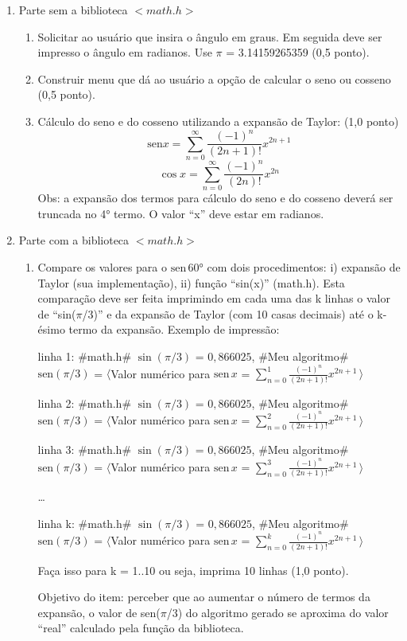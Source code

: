 \documentclass[12pt,a4paper]{article}
\newcommand{\sen}{\mathrm{sen}}
\begin{document}
\begin{enumerate}[label=\alph*)]
\item Parte sem a biblioteca $<math.h>$

\begin{enumerate}[label=a.\arabic*)]

\item Solicitar ao usuário que insira o ângulo em graus. Em seguida deve ser impresso o ângulo em radianos. Use $\pi$ = 3.14159265359 (0,5 ponto).
\item Construir menu que dá ao usuário a opção de calcular o seno ou cosseno (0,5 ponto).
\item Cálculo do seno e do cosseno utilizando a expansão de Taylor: (1,0 ponto) $$\sen x = \displaystyle\sum\limits_{n=0}^{\infty} \dfrac{(-1)^n}{(2n+1)!}x^{2n+1}$$ $$\cos x = \displaystyle\sum\limits_{n=0}^{\infty} \dfrac{(-1)^n}{(2n)!}x^{2n}$$ Obs: a expansão dos termos para cálculo do seno e do cosseno deverá ser truncada no 4° termo. O valor
“x” deve estar em radianos.
\end{enumerate}

\item Parte com a biblioteca $<math.h>$
\begin{enumerate}[label=b.\arabic*)]
\item Compare os valores para o $\sen\, 60$° com dois procedimentos: i) expansão de Taylor (sua implementação), ii) função “sin(x)” (math.h). Esta comparação deve ser feita imprimindo em cada uma das k linhas o valor de “sin($\pi$/3)” e da expansão de Taylor (com 10 casas decimais) até o k-ésimo termo da expansão. Exemplo de impressão:

\noindent\scriptsize
linha 1: \#math.h\# $\sin (\pi/3)$ = $0,866025$, \#Meu algoritmo\# $\sen (\pi/3) $ = $\langle$Valor numérico para $\sen \, x $ = $ \sum_{n=0}^{1}\frac{(-1)^n}{(2n+1)!}x^{2n+1}\, \rangle$
\normalsize

\noindent\scriptsize
linha 2: \#math.h\# $\sin (\pi/3)$ = $0,866025$, \#Meu algoritmo\# $\sen (\pi/3) $ = $\langle$Valor numérico para $\sen \, x $ = $ \sum_{n=0}^{2}\frac{(-1)^n}{(2n+1)!}x^{2n+1}\, \rangle$
\normalsize

\noindent\scriptsize
linha 3: \#math.h\# $\sin (\pi/3)$ = $0,866025$, \#Meu algoritmo\# $\sen (\pi/3) $ = $\langle$Valor numérico para $\sen \, x $ = $ \sum_{n=0}^{3}\frac{(-1)^n}{(2n+1)!}x^{2n+1}\, \rangle$
\normalsize

\dots

\noindent\scriptsize
linha k: \#math.h\# $\sin (\pi/3)$ = $0,866025$, \#Meu algoritmo\# $\sen (\pi/3) $ = $\langle$Valor numérico para $\sen \, x $ = $ \sum_{n=0}^{k}\frac{(-1)^n}{(2n+1)!}x^{2n+1}\, \rangle$
\normalsize

Faça isso para k = 1..10 ou seja, imprima 10 linhas (1,0 ponto).

Objetivo do item: perceber que ao aumentar o número de termos da expansão, o valor de sen($\pi$/3) do algoritmo gerado se aproxima do valor “real” calculado pela função da biblioteca.

\end{enumerate}

\end{enumerate}
\end{document}
